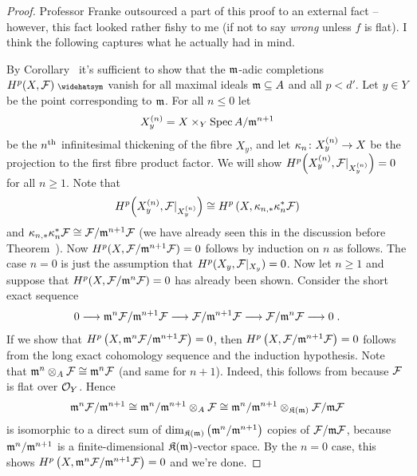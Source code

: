 \documentclass[a4paper,parskip=half,numbers=enddot, DIV=12]{scrreprt}
\renewcommand{\geq}{\geqslant}
\renewcommand{\leq}{\leqslant}
\begin{document}
\begin{proof}
	Professor Franke outsourced a part of this proof to an external fact -- however, this fact looked rather fishy to me (if not to say \emph{wrong} unless $f$ is flat). I think the following captures what he actually had in mind.
	
	By Corollary~ it's sufficient to show that the $\mathfrak{m}$-adic completions $H^p(X,\Ff)^\complete$ vanish for all maximal ideals $\mathfrak{m}\subseteq A$ and all $p<d'$. Let $y\in Y$ be the point corresponding to $\mathfrak{m}$. For all $n\leq 0$ let
	\begin{align*}
		X_y^{(n)}=X\times_Y\operatorname{Spec} A/\mathfrak{m}^{n+1}
	\end{align*}
	be the $n^{\text{th}}$ infinitesimal thickening of the fibre $X_y$, and let $\kappa_n\colon X_y^{(n)}\morphism X$ be the projection to the first fibre product factor. We will show $H^p\Big(X_y^{(n)},\mathcal{F}|_{X_y^{(n)}}\Big)=0$ for all $n\geq 1$. Note that
	\begin{align*}
		H^p\Big(X_y^{(n)},\mathcal{F}|_{X_y^{(n)}}\Big)\cong H^p\left(X,\kappa_{n,*}\kappa_n^*\mathcal{F}\right)
	\end{align*}
	and $\kappa_{n,*}\kappa_n^*\mathcal{F}\cong \mathcal{F}/\mathfrak{m}^{n+1}\mathcal{F}$ (we have already seen this in the discussion before Theorem~). Now $H^p(X,\mathcal{F}/\mathfrak{m}^{n+1}\mathcal{F})=0$ follows by induction on $n$ as follows. The case $n=0$ is just the assumption that $H^p(X_y,\mathcal{F}|_{X_y})=0$. Now let $n\geq 1$ and suppose that $H^p(X,\mathcal{F}/\mathfrak{m}^n\mathcal{F})=0$ has already been shown. Consider the short exact sequence
	\begin{align*}
		0\morphism \mm^n\Ff/\mm^{n+1}\Ff\morphism \Ff/\mm^{n+1}\Ff\morphism \Ff/\mm^n\Ff\morphism 0\;.
	\end{align*}
	If we show that $H^p\left(X,\mathfrak{m}^n\mathcal{F}/\mathfrak{m}^{n+1}\mathcal{F}\right)=0$, then $H^p\left(X,\mathcal{F}/\mathfrak{m}^{n+1}\mathcal{F}\right)=0$ follows from the long exact cohomology sequence and the induction hypothesis. Note that $\mathfrak{m}^n\otimes_A\mathcal{F}\cong \mathfrak{m}^n\mathcal{F}$ (and same for $n+1$). Indeed, this follows from \cite[Proposition~1.2.3]{homalg} because $\mathcal{F}$ is flat over $\mathcal{O}_Y$. Hence
	\begin{align*}
		\mathfrak{m}^n\mathcal{F}/\mathfrak{m}^{n+1}\cong \mathfrak{m}^n/\mathfrak{m}^{n+1}\otimes_A\mathcal{F}\cong \mathfrak{m}^n/\mathfrak{m}^{n+1}\otimes_{\mathfrak{K}(\mathfrak{m})}\mathcal{F}/\mathfrak{m}\mathcal{F}
	\end{align*}
	is isomorphic to a direct sum of $\dim_{\mathfrak{K}(\mathfrak{m})}\left(\mathfrak{m}^n/\mathfrak{m}^{n+1}\right)$ copies of $\mathcal{F}/\mathfrak{m} \mathcal{F}$, because $\mathfrak{m}^n/\mathfrak{m}^{n+1}$ is a finite-dimensional $\mathfrak{K}(\mathfrak{m})$-vector space. By the $n=0$ case, this shows $H^p\left(X,\mathfrak{m}^n\mathcal{F}/\mathfrak{m}^{n+1}\mathcal{F}\right)=0$ and we're done.
\end{proof}
\end{document}
